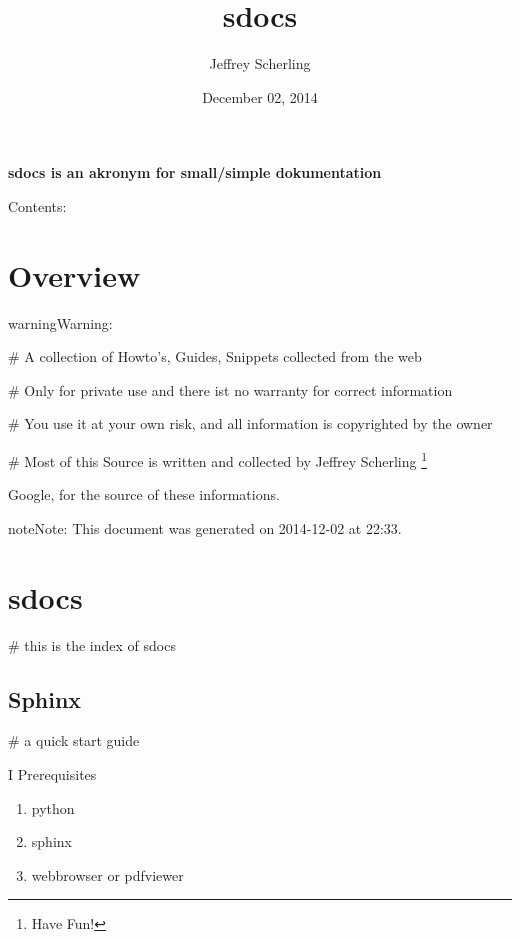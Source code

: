 \documentclass[letterpaper,10pt,english]{sphinxmanual}
\title{sdocs}
\date{December 02, 2014}
\author{Jeffrey Scherling}
\begin{document}
\maketitle
\tableofcontents
{}\label{index::doc}


\textbf{sdocs is an akronym for small/simple dokumentation}

Contents:


\chapter{Overview}
\label{sdocs/overview:overview}\label{sdocs/overview:welcome-to-sdocs}\label{sdocs/overview::doc}
\begin{notice}{warning}{Warning:}
\begin{DUlineblock}{0em}
\item[] \# A collection of Howto's, Guides, Snippets collected from the web
\item[] \# Only for private use and there ist no warranty for correct information
\item[] \# You use it at your own risk, and all information is copyrighted by the owner
\item[] \# Most of this Source is written and collected by Jeffrey Scherling \footnote{
Have Fun!
}
\end{DUlineblock}
\end{notice}




Google, for the source of these informations.



\begin{notice}{note}{Note:}
This document was generated on 2014-12-02 at 22:33.
\end{notice}


\chapter{sdocs}
\label{sdocs/index_sdocs::doc}\label{sdocs/index_sdocs:sdocs}
\# this is the index of sdocs


\section{Sphinx}
\label{sdocs/sphinx/sphinx:sphinx}\label{sdocs/sphinx/sphinx::doc}
\# a quick start guide

I Prerequisites
\begin{enumerate}
\item {} 
python

\item {} 
sphinx

\item {} 
webbrowser or pdfviewer

\end{enumerate}
\end{document}
